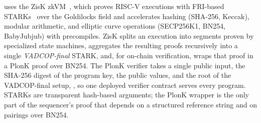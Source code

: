 \Davinci uses the ZisK \ac{zkVM}~\cite{zisk}, which proves RISC-V executions with FRI-based \acp{STARK}~\cite{bensasson2018stark,bensasson2018fri} over the Goldilocks field and accelerates hashing (SHA-256, Keccak), modular arithmetic, and elliptic curve operations (SECP256K1, BN254, BabyJubjub) with precompiles. ZisK splits an execution into segments proven by specialized state machines, aggregates the resulting proofs recursively into a single \emph{VADCOP-final} \ac{STARK}, and, for on-chain verification, wraps that proof in a PlonK proof over BN254. The PlonK verifier takes a single public input, the SHA-256 digest of the program key, the public values, and the root of the VADCOP-final setup, \rootc, so one deployed verifier contract serves every program. \acp{STARK} are transparent hash-based arguments; the PlonK wrapper is the only part of the sequencer's proof that depends on a structured reference string and on pairings over BN254.
